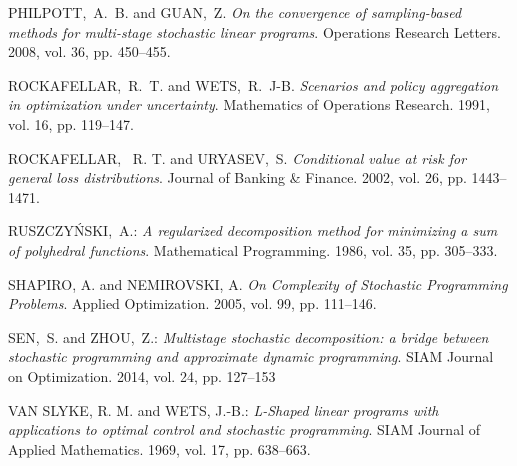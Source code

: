\documentclass{article}              %
\newcommand{\refauthor}[1]{\uppercase{#1}}
\newcommand{\reftitle}[1]{\emph{#1}}
\newcommand{\refyear}[1]{#1}
\newcommand{\refvolume}[1]{vol. #1}
\newcommand{\refissue}[1]{iss. #1}
\newcommand{\refjournal}[1]{#1}
\newcommand{\refpages}[1]{pp. #1}
\begin{document}
\begin{thebibliography}{99}
 \refauthor{Philpott,~A.~B.} and \refauthor{Guan,~Z.} \reftitle{On the convergence of sampling-based methods for multi-stage stochastic linear programs}. \refjournal{Operations Research Letters}. \refyear{2008}, \refvolume{36}, \refpages{450--455}.

 \refauthor{Rockafellar,~R.~T.} and \refauthor{Wets,~R.~J-B.}
\reftitle{Scenarios and policy aggregation in optimization under uncertainty}. \refjournal{Mathematics of Operations Research}. \refyear{1991}, \refvolume{16}, \refpages{119--147}.

 \refauthor{Rockafellar,~ R. T.} and \refauthor{Uryasev,~S.} \reftitle{Conditional value at risk for general loss distributions}. \refjournal{Journal of Banking \& Finance}.  \refyear{2002}, \refvolume{26}, \refpages{1443--1471}.

\refauthor{Ruszczy{\'n}ski,~A.}: \reftitle{A regularized decomposition method for minimizing a sum of polyhedral functions}. \refjournal{Mathematical Programming}. \refyear{1986}, \refvolume{35}, \refpages{305--333}.

 \refauthor{Shapiro, A.} and \refauthor{Nemirovski, A.} \reftitle{On Complexity of Stochastic Programming Problems}. \refjournal{Applied Optimization}. \refyear{2005}, \refvolume{99}, \refpages{111--146}.

\refauthor{Sen,~S.} and \refauthor{Zhou,~Z.}:
\reftitle{Multistage stochastic decomposition: a bridge between stochastic programming and approximate dynamic programming}.
\refjournal{SIAM Journal on Optimization}. \refyear{2014}, \refvolume{24}, \refpages{127--153}

\refauthor{Van Slyke, R. M.} and \refauthor{Wets, J.-B.}: \reftitle{L-Shaped linear programs with applications to optimal control and stochastic programming}. \refjournal{SIAM Journal of Applied Mathematics}. \refyear{1969}, \refvolume{17}, \refpages{638--663}.


\end{thebibliography}
\end{document}
